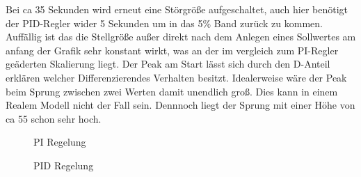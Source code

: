 \documentclass[10pt]{scrartcl}
\begin{document}
Bei ca 35 Sekunden wird erneut eine Störgröße aufgeschaltet, auch hier benötigt der PID-Regler wider 5 Sekunden um in das 5\% Band zurück zu kommen.
Auffällig ist das die Stellgröße außer direkt nach dem Anlegen eines Sollwertes am anfang der Grafik sehr konstant wirkt, was an der im vergleich zum PI-Regler geäderten Skalierung liegt.
Der Peak am Start lässt sich durch den D-Anteil erklären welcher Differenzierendes Verhalten besitzt. Idealerweise wäre der Peak beim Sprung zwischen zwei Werten damit unendlich groß. Dies kann in einem Realem Modell nicht der Fall sein. Dennnoch liegt der Sprung mit einer Höhe von ca 55 schon sehr hoch.




\begin{figure} 
\begin{center}
\caption{PI Regelung } 
\end{center}
\end{figure}

\begin{figure} 
\caption{PID Regelung} 
\end{figure}
\newpage
\end{document}

